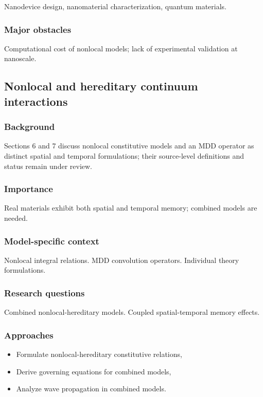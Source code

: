 Nanodevice design, nanomaterial characterization, quantum materials.

\subsubsection{Major obstacles}

Computational cost of nonlocal models; lack of experimental validation at nanoscale.

\subsection{Nonlocal and hereditary continuum interactions}
\label{sec:nonlocal-hereditary}

\subsubsection{Background}

Sections 6 and 7 discuss nonlocal constitutive models and an MDD operator as distinct spatial and temporal formulations; their source-level definitions and status remain under review.

\subsubsection{Importance}

Real materials exhibit both spatial and temporal memory; combined models are needed.

\subsubsection{Model-specific context}

Nonlocal integral relations. MDD convolution operators. Individual theory formulations.

\subsubsection{Research questions}

Combined nonlocal-hereditary models. Coupled spatial-temporal memory effects.

\subsubsection{Approaches}

\begin{itemize}
\item Formulate nonlocal-hereditary constitutive relations,
\item Derive governing equations for combined models,
\item Analyze wave propagation in combined models.
\end{itemize}

